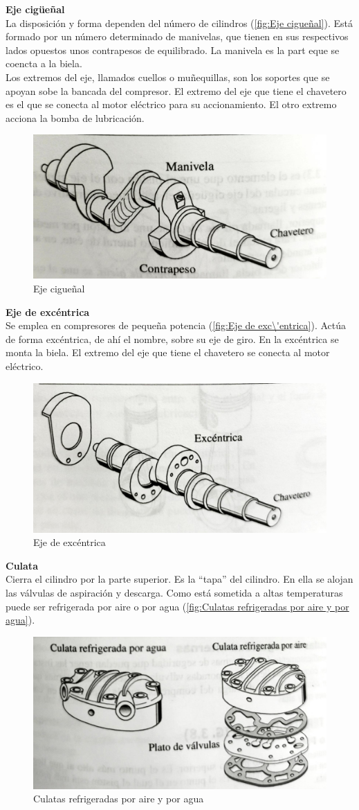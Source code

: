 \textbf{Eje cig\"ue\~{n}al}\\
La disposici\'on y forma dependen del n\'umero de cilindros (\autoref{fig:Eje cigueñal}). Est\'a formado por un n\'umero determinado de manivelas, que tienen en sus respectivos lados opuestos unos contrapesos de equilibrado. La manivela es la part eque se coencta a la biela.\\
Los extremos del eje, llamados cuellos o mu\~{n}equillas, son los soportes que se apoyan sobe la bancada del compresor. El extremo del eje que tiene el chavetero es el que se conecta al motor el\'ectrico para su accionamiento. El otro extremo acciona la bomba de lubricación.
\begin{figure}[H]
	\centering
	\includegraphics[width=.5\textwidth]{figuras/compresores/eje cigueñal.jpg}
	\caption{Eje cigueñal}
	\label{fig:Eje cigueñal}
\end{figure}
\textbf{Eje de exc\'entrica}\\
Se emplea en compresores de peque\~{n}a potencia (\autoref{fig:Eje de exc\'entrica}). Act\'ua de forma exc\'entrica, de ah\'i el nombre, sobre su eje de giro. En la exc\'entrica se monta la biela. El extremo del eje que tiene el chavetero se conecta al motor el\'ectrico.
\begin{figure}[H]
	\centering
	\includegraphics[width=.5\textwidth]{figuras/compresores/eje excentrico.jpg}
	\caption{Eje de exc\'entrica}
	\label{fig:Eje de exc\'entrica}
\end{figure}
\textbf{Culata}\\
Cierra el cilindro por la parte superior. Es la ``tapa'' del cilindro. En ella se alojan las v\'alvulas de aspiración y descarga. Como est\'a sometida a altas temperaturas puede ser refrigerada por aire o por agua (\autoref{fig:Culatas refrigeradas por aire y por agua}).
\begin{figure}[H]
	\centering
	\includegraphics[width=.5\textwidth]{figuras/compresores/culata.jpg}
	\caption{Culatas refrigeradas por aire y por agua}
	\label{fig:Culatas refrigeradas por aire y por agua}
\end{figure}
